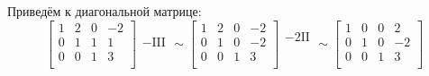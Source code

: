 Приведём к диагональной матрице:
\[
	\left[
		\begin{array}{ccc|c}
			1 & 2 & 0 & -2 \\
			0 & 1 & 1 & 1  \\
			0 & 0 & 1 & 3  \\
		\end{array}
		\right]
	\begin{array}{c}
		\\
		-\text{III} \\
		\\
	\end{array}
	\sim
	\left[
		\begin{array}{ccc|c}
			1 & 2 & 0 & -2 \\
			0 & 1 & 0 & -2 \\
			0 & 0 & 1 & 3  \\
		\end{array}
		\right]
	\begin{array}{c}
		-2 \text{II} \\
		\\
		\\
	\end{array}
	\sim
	\left[
		\begin{array}{ccc|c}
			1 & 0 & 0 & 2  \\
			0 & 1 & 0 & -2 \\
			0 & 0 & 1 & 3  \\
		\end{array}
		\right]
\]